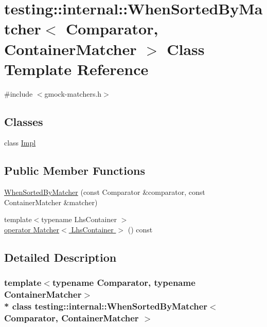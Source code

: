 \hypertarget{classtesting_1_1internal_1_1_when_sorted_by_matcher}{}\section{testing\+:\+:internal\+:\+:When\+Sorted\+By\+Matcher$<$ Comparator, Container\+Matcher $>$ Class Template Reference}
\label{classtesting_1_1internal_1_1_when_sorted_by_matcher}


{\ttfamily \#include $<$gmock-\/matchers.\+h$>$}

\subsection*{Classes}
\begin{DoxyCompactItemize}
\item 
class \hyperlink{classtesting_1_1internal_1_1_when_sorted_by_matcher_1_1_impl}{Impl}
\end{DoxyCompactItemize}
\subsection*{Public Member Functions}
\begin{DoxyCompactItemize}
\item 
\hyperlink{classtesting_1_1internal_1_1_when_sorted_by_matcher_a5c5e625b3f0be9f7380f5be744f61b1c}{When\+Sorted\+By\+Matcher} (const Comparator \&comparator, const Container\+Matcher \&matcher)
\item 
{\footnotesize template$<$typename Lhs\+Container $>$ }\\\hyperlink{classtesting_1_1internal_1_1_when_sorted_by_matcher_aad52930727946a3ed55c8bea900b30c5}{operator Matcher$<$ Lhs\+Container $>$} () const 
\end{DoxyCompactItemize}


\subsection{Detailed Description}
\subsubsection*{template$<$typename Comparator, typename Container\+Matcher$>$\\*
class testing\+::internal\+::\+When\+Sorted\+By\+Matcher$<$ Comparator, Container\+Matcher $>$}



